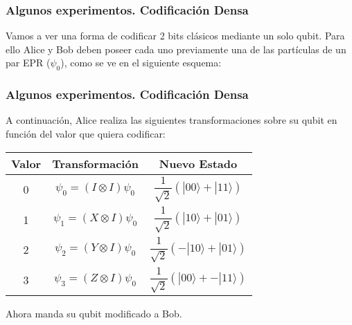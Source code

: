 \documentclass{beamer}
\newcommand{\base}[1]{|#1\rangle}
\begin{document}
\begin{frame}
	\frametitle{Algunos experimentos. Codificación Densa}
	Vamos a ver una forma de codificar 2 bits clásicos mediante un solo qubit. Para ello Alice y Bob deben poseer cada uno previamente una de las partículas de un par EPR ($\psi_0$), como se ve en el siguiente esquema:
	
\end{frame}

\begin{frame}
	\frametitle{Algunos experimentos. Codificación Densa}
	A continuación, Alice realiza las siguientes transformaciones sobre su qubit en función del valor que quiera codificar:
	
	\begin{center}
 		\begin{tabular}{||c c c||} 
 		\hline
 		Valor & Transformación & Nuevo Estado \\ [0.8ex] 
	 	\hline\hline
 		0 & $\psi_0 = (I \otimes I)\psi_0$ &  $\dfrac{1}{\sqrt{2}}(\base{00} + \base{11})$ \\ 
 		\hline
	 	1 & $\psi_1 = (X \otimes I)\psi_0$ &  $\dfrac{1}{\sqrt{2}}(\base{10} + \base{01})$  \\
 		\hline
	 	2 & $\psi_2 = (Y \otimes I)\psi_0$ &  $\dfrac{1}{\sqrt{2}}(-\base{10} + \base{01})$  \\
	 	\hline
	 	3 & $\psi_3 = (Z \otimes I)\psi_0$ &  $\dfrac{1}{\sqrt{2}}(\base{00} + -\base{11})$ \\[1ex]
	 	\hline
		\end{tabular}
	\end{center}
	Ahora manda su qubit modificado a Bob.
\end{frame}
\end{document}
